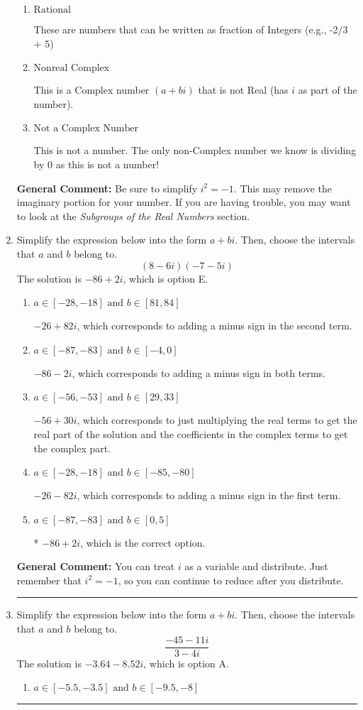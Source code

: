 \documentclass{extbook}[14pt]
\newcommand{\litem}[1]{\item #1

\rule{\textwidth}{0.4pt}}
\begin{document}
\begin{enumerate}
{\begin{enumerate}[label=\Alph*.]
* This is the correct option!
\item \( \text{Rational} \)

These are numbers that can be written as fraction of Integers (e.g., -2/3 + 5)
\item \( \text{Nonreal Complex} \)

This is a Complex number $(a+bi)$ that is not Real (has $i$ as part of the number).
\item \( \text{Not a Complex Number} \)

This is not a number. The only non-Complex number we know is dividing by 0 as this is not a number!
\end{enumerate}

\textbf{General Comment:} Be sure to simplify $i^2 = -1$. This may remove the imaginary portion for your number. If you are having trouble, you may want to look at the \textit{Subgroups of the Real Numbers} section.
}
\litem{
Simplify the expression below into the form $a+bi$. Then, choose the intervals that $a$ and $b$ belong to.
\[ (8 - 6 i)(-7 - 5 i) \]The solution is \( -86 + 2 i \), which is option E.\begin{enumerate}[label=\Alph*.]
\item \( a \in [-28, -18] \text{ and } b \in [81, 84] \)

 $-26 + 82 i$, which corresponds to adding a minus sign in the second term.
\item \( a \in [-87, -83] \text{ and } b \in [-4, 0] \)

 $-86 - 2 i$, which corresponds to adding a minus sign in both terms.
\item \( a \in [-56, -53] \text{ and } b \in [29, 33] \)

 $-56 + 30 i$, which corresponds to just multiplying the real terms to get the real part of the solution and the coefficients in the complex terms to get the complex part.
\item \( a \in [-28, -18] \text{ and } b \in [-85, -80] \)

 $-26 - 82 i$, which corresponds to adding a minus sign in the first term.
\item \( a \in [-87, -83] \text{ and } b \in [0, 5] \)

* $-86 + 2 i$, which is the correct option.
\end{enumerate}

\textbf{General Comment:} You can treat $i$ as a variable and distribute. Just remember that $i^2=-1$, so you can continue to reduce after you distribute.
}
\litem{
Simplify the expression below into the form $a+bi$. Then, choose the intervals that $a$ and $b$ belong to.
\[ \frac{-45 - 11 i}{3 - 4 i} \]The solution is \( -3.64  - 8.52 i \), which is option A.\begin{enumerate}[label=\Alph*.]
\item \( a \in [-5.5, -3.5] \text{ and } b \in [-9.5, -8] \)


\end{enumerate}}
\end{enumerate}
\end{document}
